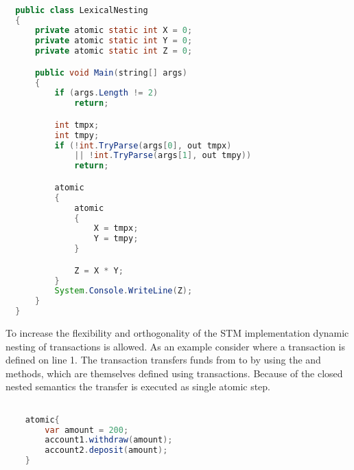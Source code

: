 \begin{lstlisting}[label=lst:stm_syntax_lexical_nesting,
  caption={Lexical Nesting},
  language=Java,  
  showspaces=false,
  showtabs=false,
  breaklines=true,
  showstringspaces=false,
  breakatwhitespace=true,
  commentstyle=\color{greencomments},
  keywordstyle=\color{bluekeywords},
  stringstyle=\color{redstrings},
  morekeywords={atomic, retry, orelse, var, get, set, using}]  % Start your code-block

  public class LexicalNesting
  {
      private atomic static int X = 0;
      private atomic static int Y = 0;
      private atomic static int Z = 0;

      public void Main(string[] args)
      {
          if (args.Length != 2)
              return;

          int tmpx;
          int tmpy;
          if (!int.TryParse(args[0], out tmpx) 
              || !int.TryParse(args[1], out tmpy))
              return;

          atomic
          {
              atomic
              {
                  X = tmpx;
                  Y = tmpy;
              }

              Z = X * Y;
          }
          System.Console.WriteLine(Z);
      }
  }
\end{lstlisting}

To increase the flexibility and orthogonality of the \ac{STM} implementation dynamic nesting of transactions is allowed. As an example consider  where a transaction is defined on line 1. The transaction transfers funds from  to  by using the  and  methods, which are themselves defined using transactions. Because of the closed nested semantics the transfer is executed as single atomic step.

\begin{lstlisting}[label=lst:stm_nested_transactions_real,
  caption={Dynamically nested transactions},
  language=Java,  
  showspaces=false,
  showtabs=false,
  breaklines=true,
  showstringspaces=false,
  breakatwhitespace=true,
  commentstyle=\color{greencomments},
  keywordstyle=\color{bluekeywords},
  stringstyle=\color{redstrings},
  morekeywords={atomic, retry, orElse, var}]  % Start your code-block

	atomic{
		var amount = 200;
		account1.withdraw(amount);
		account2.deposit(amount);
	}
       
\end{lstlisting}

